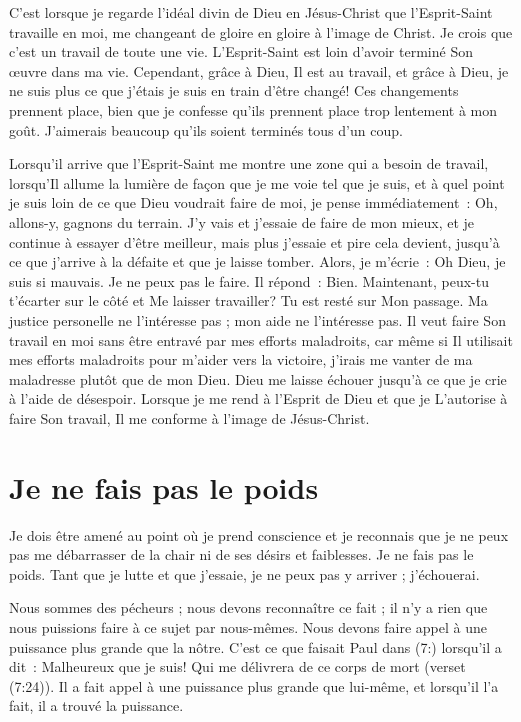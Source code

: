 C'est lorsque je regarde l'idéal divin de Dieu en Jésus-Christ
 que l'Esprit-Saint travaille en moi, me changeant de gloire en gloire
 à l'image de Christ.
 Je crois que c'est un travail de toute une vie.
 L'Esprit-Saint est loin d'avoir terminé Son œuvre dans ma vie.
 Cependant, grâce à Dieu, Il est au travail, et grâce à Dieu,
 je ne suis plus ce que j'étais
 \ocadr je suis en train d'être changé!
 Ces changements prennent place, bien que je confesse qu'ils prennent place
 trop lentement à mon goût.
 J'aimerais beaucoup qu'ils soient terminés tous d'un coup.

Lorsqu'il arrive que l'Esprit-Saint me montre une zone qui a besoin de travail,
 lorsqu'Il allume la lumière de façon que je me voie tel que je suis,
 et à quel point je suis loin de ce que Dieu voudrait faire de moi,
 je pense immédiatement~:
 \og Oh, allons-y, gagnons du terrain. \fg{}
 J'y vais et j'essaie de faire de mon mieux,
 et je continue à essayer d'être meilleur,
 mais plus j'essaie et pire cela devient,
 jusqu'à ce que j'arrive à la défaite et que je laisse tomber.
 Alors, je m'écrie~:
 \og Oh Dieu, je suis si mauvais. Je ne peux pas le faire. \fg{}
 Il répond~:
 \og Bien. Maintenant, peux-tu t'écarter sur le côté et Me laisser travailler?
 Tu est resté sur Mon passage. \fg{}
 Ma justice personelle ne l'intéresse pas ;
 mon aide ne l'intéresse pas.
 Il veut faire Son travail en moi sans être entravé
 par mes efforts maladroits,
 car même si Il utilisait mes efforts maladroits
 pour m'aider vers la victoire,
 j'irais me vanter de ma maladresse plutôt que de mon Dieu.
 Dieu me laisse échouer jusqu'à ce que je crie à l'aide de désespoir.
 Lorsque je me rend à l'Esprit de Dieu et que je L'autorise
 à faire Son travail, Il me conforme à l'image de Jésus-Christ.


\section*{Je ne fais pas le poids}

Je dois être amené au point où je prend conscience et
 je reconnais que je ne peux pas me débarrasser de la chair
 ni de ses désirs et faiblesses.
 Je ne fais pas le poids. Tant que je lutte et que j'essaie,
 je ne peux pas y arriver ; j'échouerai.

Nous sommes des pécheurs ; nous devons reconnaître ce fait ;
 il n'y a rien que nous puissions faire à ce sujet par nous-mêmes.
 Nous devons faire appel à une puissance plus grande que la nôtre.
 C'est ce que faisait Paul dans (7:) lorsqu'il a dit~:
 \og Malheureux que je suis! Qui me délivrera de ce corps de mort \fg{}
 (verset (7:24)).
 Il a fait appel à une puissance plus grande que lui-même,
 et lorsqu'il l'a fait, il a trouvé la puissance.

